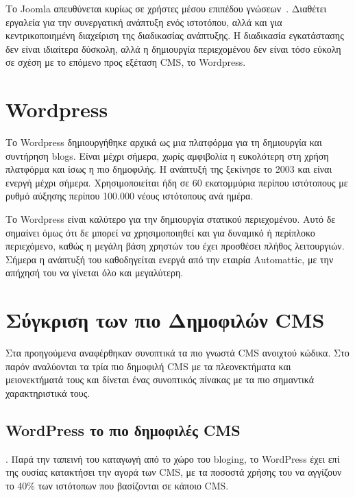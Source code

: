 \documentclass[12pt]{report}
\begin{document}
Το \textlatin{Joomla} απευθύνεται κυρίως σε χρήστες μέσου επιπέδου γνώσεων~\cite{pixelmedia}. Διαθέτει εργαλεία για την συνεργατική ανάπτυξη ενός ιστοτόπου, αλλά και για κεντρικοποιημένη διαχείριση της διαδικασίας ανάπτυξης. Η διαδικασία εγκατάστασης δεν είναι ιδιαίτερα δύσκολη, αλλά η δημιουργία περιεχομένου δεν είναι τόσο εύκολη σε σχέση με το επόμενο προς εξέταση \textlatin{CMS}, το \textlatin{Wordpress}.

\section{\textlatin{Wordpress}}
Το \textlatin{Wordpress} δημιουργήθηκε αρχικά ως μια πλατφόρμα για τη δημιουργία και συντήρηση \textlatin{blogs}. Είναι μέχρι σήμερα, χωρίς αμφιβολία η ευκολότερη στη χρήση πλατφόρμα και ίσως η πιο δημοφιλής. Η ανάπτυξή της ξεκίνησε το 2003 και είναι ενεργή μέχρι σήμερα. Χρησιμοποιείται ήδη σε 60 εκατομμύρια περίπου ιστότοπους με ρυθμό αύξησης περίπου 100.000 νέους ιστότοπους ανά ημέρα.

Το \textlatin{Wordpress} είναι καλύτερο για την δημιουργία στατικού περιεχομένου. Αυτό δε σημαίνει όμως ότι δε μπορεί να χρησιμοποιηθεί και για δυναμικό ή περίπλοκο περιεχόμενο, καθώς η μεγάλη βάση χρηστών του έχει προσθέσει πλήθος λειτουργιών. Σήμερα η ανάπτυξή του καθοδηγείται ενεργά από την εταιρία \textlatin{Automattic}, με την απήχησή του να γίνεται όλο και μεγαλύτερη.

\section{Σύγκριση των πιο Δημοφιλών \textlatin{CMS}}
Στα προηγούμενα αναφέρθηκαν συνοπτικά τα πιο γνωστά \textlatin{CMS} ανοιχτού κώδικα. Στο παρόν αναλύονται τα τρία πιο δημοφιλή \textlatin{CMS} με τα πλεονεκτήματα και μειονεκτήματά τους και δίνεται ένας συνοπτικός πίνακας με τα πιο σημαντικά χαρακτηριστικά τους.

\subsection{\textlatin{WordPress} το πιο δημοφιλές \textlatin{CMS}}.
Παρά την ταπεινή του καταγωγή από το χώρο του \textlatin{bloging}, το \textlatin{WordPress} έχει επί της ουσίας κατακτήσει την αγορά των \textlatin{CMS}, με τα ποσοστά χρήσης του να αγγίζουν το 40\% των ιστότοπων που βασίζονται σε κάποιο \textlatin{CMS}.
\end{document}
